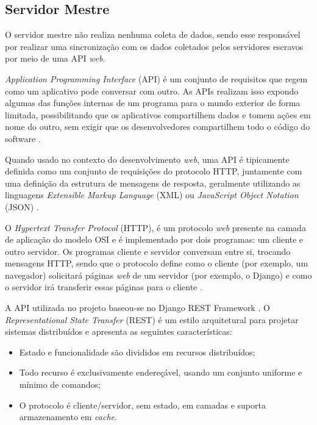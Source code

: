 \subsection{Servidor Mestre}
O servidor mestre não realiza nenhuma coleta de dados, sendo esse responsável por realizar uma sincronização com os dados coletados pelos servidores escravos por meio de uma API \textit{web}.

\textit{Application Programming Interface} (API) é um conjunto de requisitos que regem como um aplicativo pode conversar com outro. As APIs realizam isso expondo algumas das funções internas de um programa para o mundo exterior de forma limitada, possibilitando que os aplicativos compartilhem dados e tomem ações em nome do outro, sem exigir que os desenvolvedores compartilhem todo o código do software \cite{brian_api}.

Quando usado no contexto do desenvolvimento \textit{web}, uma API é tipicamente definida como um conjunto de requisições do protocolo HTTP, juntamente com uma definição da estrutura de mensagens de resposta, geralmente utilizando as linguagens \textit{Extensible Markup Language} (XML) ou \textit{JavaScript Object Notation} (JSON) \cite{benslimane_2008}.

O \textit{Hypertext Transfer Protocol} (HTTP), é um protocolo \textit{web} presente na camada de aplicação do modelo OSI e é implementado por dois programas: um cliente e outro servidor. Os programas cliente e servidor conversam entre si, trocando mensagens HTTP, sendo que o protocolo define como o cliente (por exemplo, um navegador) solicitará páginas \textit{web} de um servidor (por exemplo, o Django) e como o servidor irá transferir essas páginas para o cliente \cite{kurose_2002}.

A API utilizada no projeto baseou-se no Django REST Framework \cite{django_rest}. O \textit{Representational State Transfer} (REST) \cite{fielding_2000} é um estilo arquitetural para projetar sistemas distribuídos e apresenta as seguintes características:

\begin{itemize}
    \item Estado e funcionalidade são divididos em recursos distribuídos;
    \item Todo recurso é exclusivamente endereçável, usando um conjunto uniforme e mínimo de comandos;
    \item O protocolo é cliente/servidor, sem estado, em camadas e suporta armazenamento em \textit{cache}.
\end{itemize}

